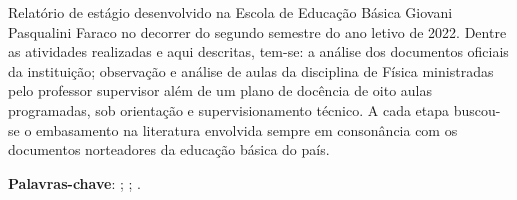 \setlength{\absparsep}{18pt} %
\begin{resumo}
    Relatório de estágio desenvolvido na Escola de Educação Básica Giovani Pasqualini Faraco no decorrer do segundo semestre do ano letivo de 2022. Dentre as atividades realizadas e aqui descritas, tem-se: a análise dos documentos oficiais da instituição; observação e análise de aulas da disciplina de Física ministradas pelo professor supervisor além de um plano de docência de oito aulas programadas, sob orientação e supervisionamento técnico. A cada etapa buscou-se o embasamento na literatura envolvida sempre em consonância com os documentos norteadores da educação básica do país.

\textbf{Palavras-chave}: \firstkey ; \secondkey ; \thirdkey.
\end{resumo}